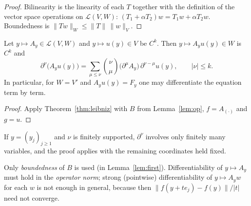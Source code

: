 \begin{proof}
Bilinearity is the linearity of each $T$ together with the definition of the vector space operations on
$\mathcal L(V,W)$:
$(T_1+\alpha T_2)w=T_1w+\alpha T_2w$. Boundedness is $\|Tw\|_W\le\|T\|\,\|w\|_V$.
\end{proof}

\begin{theorem}\label{cor:op}
Let $y\mapsto A_y\in\mathcal L(V,W)$ and $y\mapsto u(y)\in V$ be $C^k$. Then
$y\mapsto A_yu(y)\in W$ is $C^k$ and
\[
  \partial^\nu\big(A_yu(y)\big)=\sum_{\mu\le\nu}\binom{\nu}{\mu}\big(\partial^\mu A_y\big)\,\partial^{\nu-\mu}u(y),
  \qquad |\nu|\le k .
\]
In particular, for $W=V'$ and $A_yu(y)=F_y$ one may differentiate the equation term by term.
\end{theorem}

\begin{proof}
Apply Theorem~\ref{thm:leibniz} with $B$ from Lemma~\ref{lem:op}, $f=A_{(\cdot)}$ and $g=u$.
\end{proof}

\begin{remark}
If $y=(y_j)_{j\ge1}$ and $\nu$ is finitely supported, $\partial^\nu$ involves only finitely many variables,
and the proof applies with the remaining coordinates held fixed.
\end{remark}

\begin{remark}
Only \emph{boundedness} of $B$ is used (in Lemma~\ref{lem:first}). Differentiability of $y\mapsto A_y$ must hold
in the \emph{operator norm}; strong (pointwise) differentiability of $y\mapsto A_yw$ for each $w$ is not enough
in general, because then $\|f(y+te_j)-f(y)\|/|t|$ need not converge.
\end{remark}
